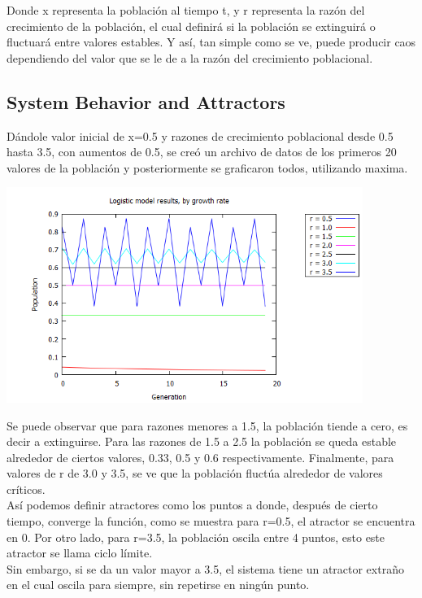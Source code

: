 \documentclass[12pt]{article}
\begin{document}
Donde x representa la población al tiempo t, y r representa la razón del crecimiento de la población, el cual definirá si la población se extinguirá o fluctuará entre valores estables. Y así, tan simple como se ve, puede producir caos dependiendo del valor que se le de a la razón del crecimiento poblacional. 

\subsection{System Behavior and Attractors}

Dándole valor inicial de x=0.5 y razones de crecimiento poblacional desde 0.5 hasta 3.5, con aumentos de 0.5, se creó un archivo de datos de los primeros 20 valores de la población y posteriormente se graficaron todos, utilizando maxima. 

\begin{center}
 \includegraphics[height=7cm]{1.png}
 \end{center}

Se puede observar que para razones menores a 1.5, la población tiende a cero, es decir a extinguirse. Para las razones de 1.5 a 2.5 la población se queda estable alrededor de ciertos valores, 0.33, 0.5 y 0.6 respectivamente. Finalmente, para valores de r de 3.0 y 3.5, se ve que la población fluctúa alrededor de valores críticos.\\

Así podemos definir atractores como los puntos a donde, después de cierto tiempo, converge la función, como se muestra para r=0.5, el atractor se encuentra en 0. Por otro lado, para r=3.5, la población oscila entre 4 puntos, esto este atractor se llama ciclo límite. \\

Sin embargo, si se da un valor mayor a 3.5, el sistema tiene un atractor extraño en el cual oscila para siempre, sin repetirse en ningún punto.
\end{document}
